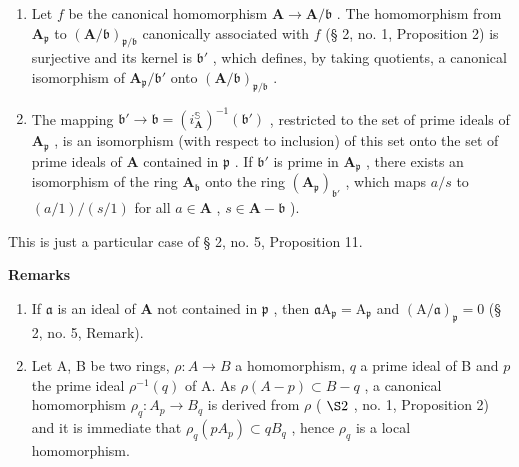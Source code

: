 \begin{enumerate}
\def\labelenumi{(\roman{enumi})}
\item
  Let \(f\) be the canonical homomorphism \(\mathbf{A} \to \mathbf{A} / \mathfrak{b}\) . The homomorphism from \(\mathbf{A}_{\mathfrak{p}}\) to \((\mathbf{A} / \mathfrak{b})_{\mathfrak{p} / \mathfrak{b}}\) canonically associated with \(f\) (§ 2, no. 1, Proposition 2) is surjective and its kernel is \(\mathfrak{b}'\) , which defines, by taking quotients, a canonical isomorphism of \(\mathbf{A}_{\mathfrak{p}} / \mathfrak{b}'\) onto \((\mathbf{A} / \mathfrak{b})_{\mathfrak{p} / \mathfrak{b}}\) .
\item
  The mapping \(\mathfrak{b}' \to \mathfrak{b} = (i_{\mathbf{A}}^{\mathbb{S}})^{-1}(\mathfrak{b}')\) , restricted to the set of prime ideals of \(\mathbf{A}_{\mathfrak{p}}\) , is an isomorphism (with respect to inclusion) of this set onto the set of prime ideals of \(\mathbf{A}\) contained in \(\mathfrak{p}\) . If \(\mathfrak{b}'\) is prime in \(\mathbf{A}_{\mathfrak{p}}\) , there exists an isomorphism of the ring \(\mathbf{A}_{\mathfrak{b}}\) onto the ring \((\mathbf{A}_{\mathfrak{p}})_{\mathfrak{b}'}\) , which maps \(a / s\) to \((a / 1) / (s / 1)\) for all \(a \in \mathbf{A}\) , \(s \in \mathbf{A} - \mathfrak{b}\) ).
\end{enumerate}

This is just a particular case of § 2, no. 5, Proposition 11.

\textbf{Remarks}\par

\begin{enumerate}
\def\labelenumi{(\arabic{enumi})}
\setcounter{enumi}{2}
\item
  If \(\mathfrak{a}\) is an ideal of \(\mathbf{A}\) not contained in \(\mathfrak{p}\) , then \(\mathfrak{a}\mathrm{A}_{\mathfrak{p}} = \mathrm{A}_{\mathfrak{p}}\) and \((\mathrm{A} / \mathfrak{a})_{\mathfrak{p}} = 0\) (§ 2, no. 5, Remark).
\item
  Let A, B be two rings, \(\rho: A \to B\) a homomorphism, \(q\) a prime ideal of B and \(p\) the prime ideal \(\rho^{-1}(q)\) of A. As \(\rho(A - p) \subset B - q\) , a canonical homomorphism \(\rho_q: A_p \to B_q\) is derived from \(\rho\) ( \(\S 2\) , no. 1, Proposition 2) and it is immediate that \(\rho_q(pA_p) \subset qB_q\) , hence \(\rho_q\) is a local homomorphism.
\end{enumerate}
